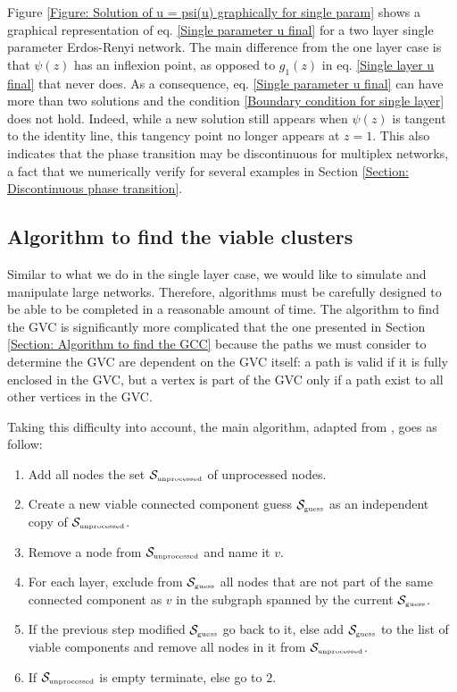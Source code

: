 \documentclass[
11pt, %
american, %
singlespacing, %
final, %
nolistspacing, %
liststotoc, %
headsepline, %
]{MastersDoctoralThesis} %
\begin{document}
Figure \ref{Figure: Solution of u = psi(u) graphically for single param} shows a graphical representation of eq. \eqref{Single parameter u final} for a two layer single parameter Erdos-Renyi network. The main difference from the one layer case is that $\psi(z)$ has an inflexion point, as opposed to $g_1(z)$ in eq. \eqref{Single layer u final} that never does. As a consequence, eq. \eqref{Single parameter u final} can have more than two solutions and the condition \eqref{Boundary condition for single layer} does not hold. Indeed, while a new solution still appears when $\psi(z)$ is tangent to the identity line, this tangency point no longer appears at $z = 1$. This also indicates that the phase transition may be discontinuous for multiplex networks, a fact that we numerically verify for several examples in Section \ref{Section: Discontinuous phase transition}.

\subsection{Algorithm to find the viable clusters}
\label{Section: Algorithm to find the GVC}

Similar to what we do in the single layer case, we would like to simulate and manipulate large networks. Therefore, algorithms must be carefully designed to be able to be completed in a reasonable amount of time. The algorithm to find the GVC is significantly more complicated that the one presented in Section \ref{Section: Algorithm to find the GCC} because the paths we must consider to determine the GVC are dependent on the GVC itself: a path is valid if it is fully enclosed in the GVC, but a vertex is part of the GVC only if a path exist to all other vertices in the GVC. 

Taking this difficulty into account, the main algorithm, adapted from \cite{baxter2012avalanche}, goes as follow:

\begin{enumerate}
	\item Add all nodes the set $\mathcal{S}_{\text{\tiny unprocessed}}$ of unprocessed nodes.
	\item Create a new viable connected component guess $\mathcal{S}_{\text{\tiny guess}}$ as an independent copy of $\mathcal{S}_{\text{\tiny unprocessed}}$.
	\item Remove a node from $\mathcal{S}_{\text{\tiny unprocessed}}$ and name it $v$.
	\item For each layer, exclude from $\mathcal{S}_{\text{\tiny guess}}$ all nodes that are not part of the same connected component as $v$ in the subgraph spanned by the current $\mathcal{S}_{\text{\tiny guess}}$.
	\item If the previous step modified $\mathcal{S}_{\text{\tiny guess}}$ go back to it, else add $\mathcal{S}_{\text{\tiny guess}}$ to the list of viable components and remove all nodes in it from $\mathcal{S}_{\text{\tiny unprocessed}}$.
	\item If $\mathcal{S}_{\text{\tiny unprocessed}}$ is empty terminate, else go to $2$.
\end{enumerate}
\end{document}
